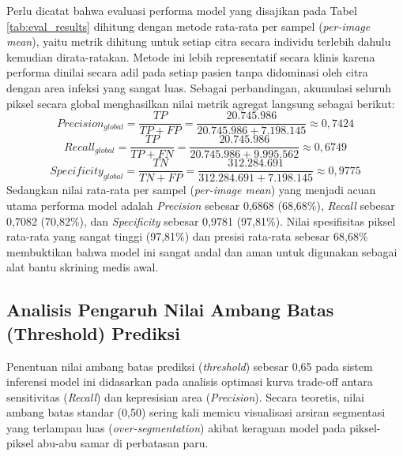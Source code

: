 \documentclass[12pt,a4paper,oneside]{book}
\begin{document}
Perlu dicatat bahwa evaluasi performa model yang disajikan pada Tabel \ref{tab:eval_results} dihitung dengan metode rata-rata per sampel (\textit{per-image mean}), yaitu metrik dihitung untuk setiap citra secara individu terlebih dahulu kemudian dirata-ratakan. Metode ini lebih representatif secara klinis karena performa dinilai secara adil pada setiap pasien tanpa didominasi oleh citra dengan area infeksi yang sangat luas. Sebagai perbandingan, akumulasi seluruh piksel secara global menghasilkan nilai metrik agregat langsung sebagai berikut:
\begin{equation}
    Precision_{global} = \frac{TP}{TP + FP} = \frac{20.745.986}{20.745.986 + 7.198.145} \approx 0,7424
\end{equation}
\begin{equation}
    Recall_{global} = \frac{TP}{TP + FN} = \frac{20.745.986}{20.745.986 + 9.995.562} \approx 0,6749
\end{equation}
\begin{equation}
    Specificity_{global} = \frac{TN}{TN + FP} = \frac{312.284.691}{312.284.691 + 7.198.145} \approx 0,9775
\end{equation}
Sedangkan nilai rata-rata per sampel (\textit{per-image mean}) yang menjadi acuan utama performa model adalah \textit{Precision} sebesar 0,6868 (68,68\%), \textit{Recall} sebesar 0,7082 (70,82\%), dan \textit{Specificity} sebesar 0,9781 (97,81\%). Nilai spesifisitas piksel rata-rata yang sangat tinggi (97,81\%) dan presisi rata-rata sebesar 68,68\% membuktikan bahwa model ini sangat andal dan aman untuk digunakan sebagai alat bantu skrining medis awal.

\subsection{Analisis Pengaruh Nilai Ambang Batas (Threshold) Prediksi}

Penentuan nilai ambang batas prediksi (\textit{threshold}) sebesar 0,65 pada sistem inferensi model ini didasarkan pada analisis optimasi kurva trade-off antara sensitivitas (\textit{Recall}) dan kepresisian area (\textit{Precision}). Secara teoretis, nilai ambang batas standar (0,50) sering kali memicu visualisasi arsiran segmentasi yang terlampau luas (\textit{over-segmentation}) akibat keraguan model pada piksel-piksel abu-abu samar di perbatasan paru.
\end{document}
